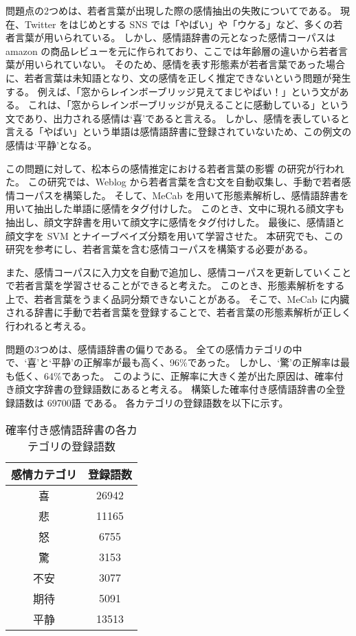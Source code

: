 \documentclass[11pt,a4j]{jsarticle}
\begin{document}
問題点の2つめは、若者言葉が出現した際の感情抽出の失敗についてである。
現在、Twitter をはじめとする SNS では「やばい」や「ウケる」など、多くの若者言葉が用いられている。
しかし、感情語辞書の元となった感情コーパスは amazon の商品レビューを元に作られており、ここでは年齢層の違いから若者言葉が用いられていない。
そのため、感情を表す形態素が若者言葉であった場合に、若者言葉は未知語となり、文の感情を正しく推定できないという問題が発生する。
例えば、「窓からレインボーブリッジ見えてまじやばい！」という文がある。
これは、「窓からレインボーブリッジが見えることに感動している」という文であり、出力される感情は`喜'であると言える。
しかし、感情を表していると言える「やばい」という単語は感情語辞書に登録されていないため、この例文の感情は`平静'となる。

この問題に対して、松本らの感情推定における若者言葉の影響  の研究が行われた。
この研究では、Weblog から若者言葉を含む文を自動収集し、手動で若者感情コーパスを構築した。
そして、MeCab を用いて形態素解析し、感情語辞書を用いて抽出した単語に感情をタグ付けした。
このとき、文中に現れる顔文字も抽出し、顔文字辞書を用いて顔文字に感情をタグ付けした。
最後に、感情語と顔文字を SVM とナイーブベイズ分類を用いて学習させた。
本研究でも、この研究を参考にし、若者言葉を含む感情コーパスを構築する必要がある。

また、感情コーパスに入力文を自動で追加し、感情コーパスを更新していくことで若者言葉を学習させることができると考えた。
このとき、形態素解析をする上で、若者言葉をうまく品詞分類できないことがある。
そこで、MeCab に内臓される辞書に手動で若者言葉を登録することで、若者言葉の形態素解析が正しく行われると考える。

問題の3つめは、感情語辞書の偏りである。
全ての感情カテゴリの中で、`喜'と`平静'の正解率が最も高く、96\%であった。
しかし、`驚'の正解率は最も低く、64\%であった。
このように、正解率に大きく差が出た原因は、確率付き顔文字辞書の登録語数にあると考える。
構築した確率付き感情語辞書の全登録語数は 69700語 である。
各カテゴリの登録語数を以下に示す。

\begin{table}[h]
  \caption{確率付き感情語辞書の各カテゴリの登録語数}
\centering
\begin{tabular}{c|c} \hline
  感情カテゴリ & 登録語数 \\ \hline \hline
  喜 & 26942 \\ \hline
  悲 & 11165 \\ \hline
  怒 & 6755 \\ \hline
  驚 & 3153 \\ \hline
  不安 & 3077 \\ \hline
  期待 & 5091 \\ \hline
  平静 & 13513 \\ \hline
\end{tabular}
\end{table}
\end{document}
